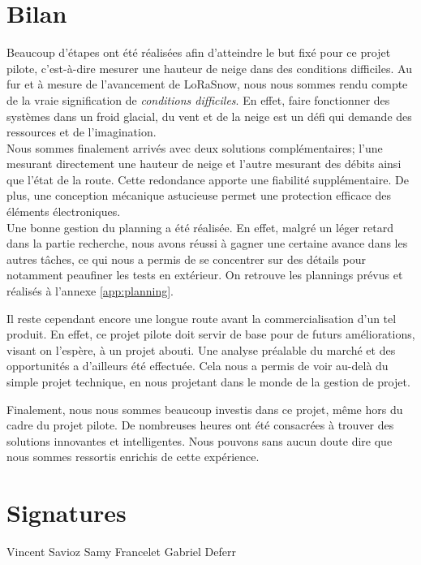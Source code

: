 \section{Bilan}

Beaucoup d'étapes ont été réalisées afin d'atteindre le but fixé pour ce projet pilote, c'est-à-dire 
mesurer une hauteur de neige dans des conditions difficiles. Au fur et à mesure de l'avancement de LoRaSnow,
nous nous sommes rendu compte de la vraie signification de \emph{conditions difficiles}. En effet, faire 
fonctionner des systèmes dans un froid glacial, du vent et de la neige est un défi qui demande des
ressources et de l'imagination.\\
Nous sommes finalement arrivés avec deux solutions complémentaires; l'une mesurant directement une hauteur 
de neige et l'autre mesurant des débits ainsi que l'état de la route. Cette redondance apporte une fiabilité
supplémentaire. De plus, une conception mécanique astucieuse permet une protection efficace des éléments 
électroniques.\\
Une bonne gestion du planning a été réalisée. En effet, malgré un léger retard dans la partie
recherche, nous avons réussi à gagner une certaine avance dans les autres tâches, ce qui nous a permis de 
se concentrer sur des détails pour notamment peaufiner les tests en extérieur. On retrouve les plannings prévus et 
réalisés à l'annexe \ref{app:planning}.\par 
Il reste cependant encore une longue route avant la commercialisation d'un tel produit. En effet, ce projet 
pilote doit servir de base pour de futurs améliorations, visant on l'espère, à un projet abouti. Une analyse
préalable du marché et des opportunités a d'ailleurs été effectuée. Cela nous a permis de voir au-delà du
simple projet technique, en nous projetant dans le monde de la gestion de projet.\par 
Finalement, nous nous sommes beaucoup investis dans ce projet, même hors du cadre du projet pilote. De 
nombreuses heures ont été consacrées à trouver des solutions innovantes et intelligentes. Nous pouvons sans 
aucun doute dire que nous sommes ressortis enrichis de cette expérience.

\section{Signatures}

\vspace{\fill}
Vincent Savioz \hfill Samy Francelet \hfill Gabriel Deferr
\vspace{\fill}